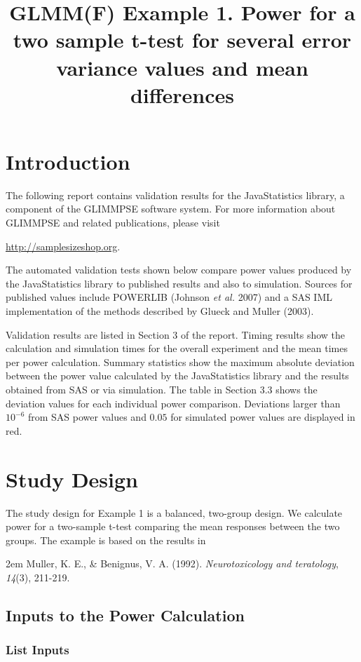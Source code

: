 \title{GLMM(F) Example 1. Power for a two sample t-test for several error variance values and mean differences}

\section{Introduction}
The following report contains validation results for the JavaStatistics library, a component of the GLIMMPSE software system.  For more information about GLIMMPSE and related publications, please visit

 

\href{http://samplesizeshop.org}{http://samplesizeshop.org}.

The automated validation tests shown below compare power values produced by the JavaStatistics library to published results and also to simulation.  Sources for published values include POWERLIB (Johnson \emph{et al.} 2007) and a SAS IML implementation of the methods described by Glueck and Muller (2003).

Validation results are listed in Section 3 of the report.  Timing results show the calculation and simulation times for the overall experiment and the mean times per power calculation.  Summary statistics show the maximum absolute deviation between the power value calculated by the JavaStatistics library and the results obtained from SAS or via simulation.  The table in Section 3.3 shows the deviation values for each individual power comparison.  Deviations larger than $10^{-6}$ from SAS power values and $0.05$ for simulated power values are displayed in red.

 \section{Study Design}
The study design for Example 1 is a balanced, two-group design.  We calculate power for a two-sample t-test comparing the mean responses between the two groups.  The example is based on the results in 

\hangindent2em
Muller, K. E., \& Benignus, V. A. (1992). \emph{Neurotoxicology and teratology}, \emph{14}(3), 211-219.
\subsection{Inputs to the Power Calculation}
\subsubsection{List Inputs}

